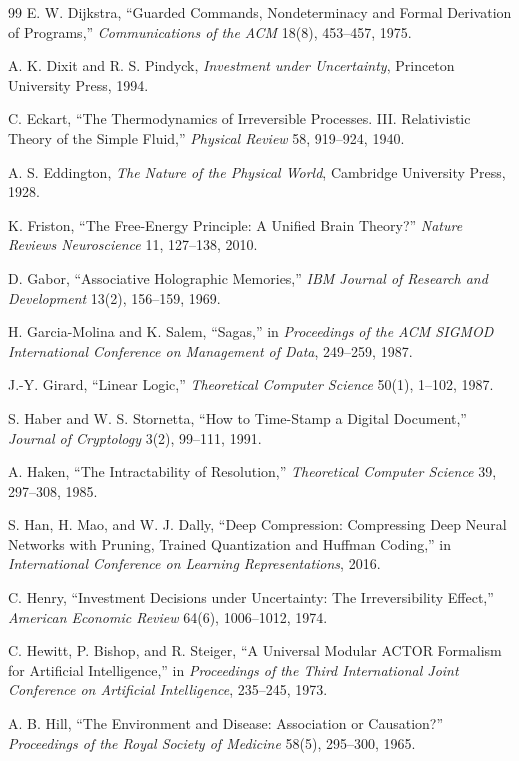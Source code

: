 \documentclass[11pt,twoside,openright]{book}
\theoremstyle{plain}
\theoremstyle{definition}
\theoremstyle{remark}
\begin{document}
\begin{thebibliography}{99}
 E. W. Dijkstra, ``Guarded Commands, Nondeterminacy and Formal Derivation of Programs,'' \emph{Communications of the ACM} 18(8), 453--457, 1975.

 A. K. Dixit and R. S. Pindyck, \emph{Investment under Uncertainty}, Princeton University Press, 1994.

 C. Eckart, ``The Thermodynamics of Irreversible Processes. III. Relativistic Theory of the Simple Fluid,'' \emph{Physical Review} 58, 919--924, 1940.

 A. S. Eddington, \emph{The Nature of the Physical World}, Cambridge University Press, 1928.

 K. Friston, ``The Free-Energy Principle: A Unified Brain Theory?'' \emph{Nature Reviews Neuroscience} 11, 127--138, 2010.

 D. Gabor, ``Associative Holographic Memories,'' \emph{IBM Journal of Research and Development} 13(2), 156--159, 1969.

 H. Garcia-Molina and K. Salem, ``Sagas,'' in \emph{Proceedings of the ACM SIGMOD International Conference on Management of Data}, 249--259, 1987.

 J.-Y. Girard, ``Linear Logic,'' \emph{Theoretical Computer Science} 50(1), 1--102, 1987.

 S. Haber and W. S. Stornetta, ``How to Time-Stamp a Digital Document,'' \emph{Journal of Cryptology} 3(2), 99--111, 1991.

 A. Haken, ``The Intractability of Resolution,'' \emph{Theoretical Computer Science} 39, 297--308, 1985.

 S. Han, H. Mao, and W. J. Dally, ``Deep Compression: Compressing Deep Neural Networks with Pruning, Trained Quantization and Huffman Coding,'' in \emph{International Conference on Learning Representations}, 2016.

 C. Henry, ``Investment Decisions under Uncertainty: The Irreversibility Effect,'' \emph{American Economic Review} 64(6), 1006--1012, 1974.

 C. Hewitt, P. Bishop, and R. Steiger, ``A Universal Modular ACTOR Formalism for Artificial Intelligence,'' in \emph{Proceedings of the Third International Joint Conference on Artificial Intelligence}, 235--245, 1973.

 A. B. Hill, ``The Environment and Disease: Association or Causation?'' \emph{Proceedings of the Royal Society of Medicine} 58(5), 295--300, 1965.


\end{thebibliography}
\end{document}
